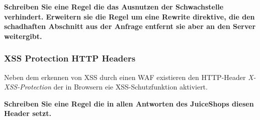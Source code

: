 \textbf{Schreiben Sie eine Regel die das Ausnutzen der Schwachstelle verhindert.
Erweitern sie die Regel um eine Rewrite direktive, die den schadhaften Abschnitt aus der Anfrage entfernt sie aber an den Server weitergibt.}

\subsubsection{XSS Protection HTTP Headers}

Neben dem erkennen von XSS durch einen WAF existieren den HTTP-Header \textit{X-XSS-Protection} der in Browsern eie XSS-Schutzfunktion aktiviert.

\textbf{Schreiben Sie eine Regel die in allen Antworten des JuiceShops diesen Header setzt.}

\pagebreak